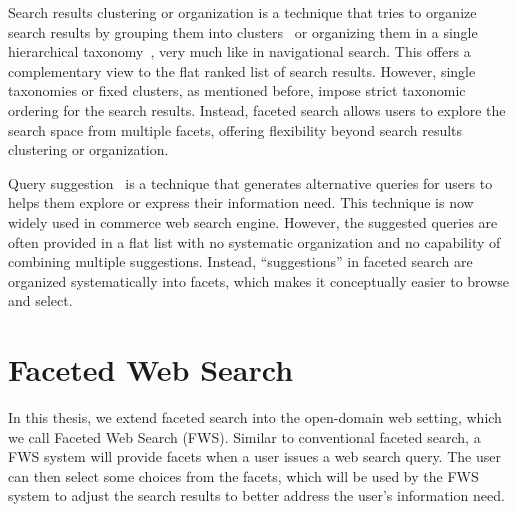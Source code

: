 Search results clustering or organization is a technique that tries to organize search results by grouping them into clusters~\cite{cutting1992scatter,kaki2005findex,zamir1999grouper,carpineto2009survey} or organizing them in a single hierarchical taxonomy~\cite{lawrie2001finding,lawrie2003generating, nevill1999lexically}, very much like in navigational search. This offers a complementary view to the flat ranked list of search results. However, single taxonomies or fixed clusters, as mentioned before, impose strict taxonomic ordering for the search results. Instead, faceted search allows users to explore the search space from multiple facets, offering flexibility beyond search results clustering or organization.

Query suggestion~\cite{baeza2004query, cao2008context} is a technique that generates alternative queries for users to helps them explore or express their information need. This technique is now widely used in commerce web search engine. However, the suggested queries are often provided in a flat list with no systematic organization and no capability of combining multiple suggestions. Instead, ``suggestions'' in faceted search are organized systematically into facets, which makes it conceptually easier to browse and select.

\section{Faceted Web Search}
\label{sec:intro-fws}
In this thesis, we extend faceted search into the open-domain web setting, which we call Faceted Web Search (FWS). Similar to conventional faceted search, a FWS system will provide facets when a user issues a web search query. The user can then select some choices from the facets, which will be used by the FWS system to adjust the search results to better address the user's information need.

